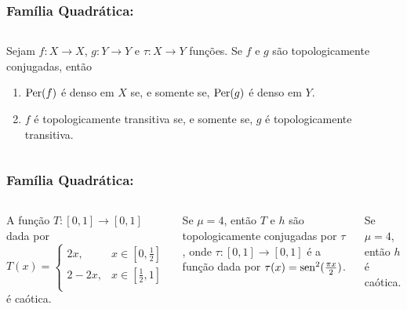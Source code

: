 \begin{frame}
\vspace{5pt}
\frametitle{Família Quadrática: \subsecname}
\begin{columns}
\column{\dimexpr\paperwidth-15pt}

\begin{proposition}
Sejam $f: X \to X$, $g: Y \to Y$ e $\tau: X \to Y$ funções. Se $f$ e $g$ são topologicamente conjugadas, então
\begin{enumerate}
\item $\operatorname{Per}(f)$ é denso em $X$ se, e somente se, $\operatorname{Per}(g)$ é denso em $Y$.
\item $f$ é topologicamente transitiva se, e somente se, $g$ é topologicamente transitiva.
\end{enumerate}
\end{proposition}

\end{columns}
\end{frame}


\begin{frame}
\vspace{5pt}
\frametitle{Família Quadrática: \subsecname}
\begin{columns}
\column{\dimexpr\paperwidth-15pt}

\begin{lemma}
A função $T: [0,1] \to [0,1]$ dada por
\[ T(x) =
  \begin{cases}
    2x, & x \in \left[ 0, \frac{1}{2} \right] \\
    2 - 2x, & x \in \left[ \frac{1}{2}, 1 \right] \\
  \end{cases}
\]
é caótica.
\end{lemma}

\vspace{10pt}

\begin{theorem}
Se $\mu = 4$, então $T$ e $h$ são topologicamente conjugadas por $\tau$, onde $\tau: [0, 1] \to [0, 1]$ é a função dada por $\tau(x) = \operatorname{sen}^2(\frac{\pi x}{2})$.
\end{theorem}

\vspace{10pt}

\begin{corollary}
Se $\mu = 4$, então $h$ é caótica.
\end{corollary}

\end{columns}
\end{frame}

